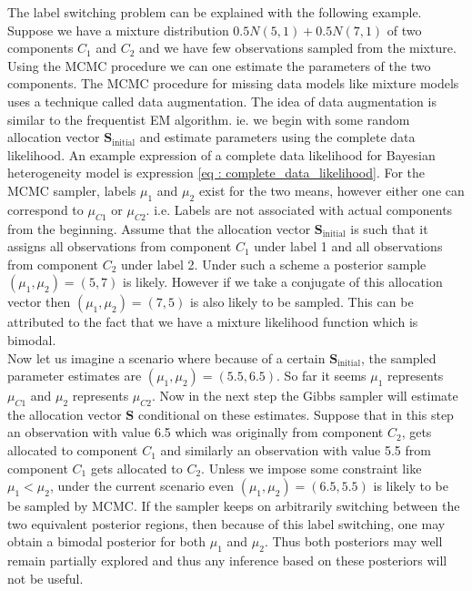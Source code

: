 The label switching problem can be explained with the following example. Suppose we have a mixture distribution $0.5N(5,1) + 0.5N(7,1)$ of two components $C_1$ and $C_2$ and we have few observations sampled from the mixture. Using the MCMC procedure we can one estimate the parameters of the two components. The MCMC procedure for missing data models like mixture models uses a technique called data augmentation. The idea of data augmentation is similar to the frequentist EM algorithm. ie. we begin with some random allocation vector $\boldsymbol{S}_\text{initial}$ and estimate parameters using the complete data likelihood. An example expression of a complete data likelihood for Bayesian heterogeneity model is expression \ref{eq : complete_data_likelihood}. For the MCMC sampler, labels $\mu_1$ and $\mu_2$ exist for the two means, however either one can correspond to $\mu_{C1}$ or $\mu_{C2}$. i.e. Labels are not associated with actual components from the beginning. Assume that the allocation vector $\boldsymbol{S}_\text{initial}$ is such that it assigns all observations from component $C_1$ under label 1 and all observations from component $C_2$ under label 2. Under such a scheme a posterior sample $(\mu_1,\mu_2) = (5,7)$ is likely. However if we take a conjugate of this allocation vector then $(\mu_1,\mu_2) = (7,5)$ is also likely to be sampled. This can be attributed to the fact that we have a mixture likelihood function which is bimodal.\\

Now let us imagine a scenario where because of a certain $\boldsymbol{S}_\text{initial}$, the sampled parameter estimates are $(\mu_1, \mu_2) = (5.5,6.5)$. So far it seems $\mu_1$ represents $\mu_{C1}$ and $\mu_2$ represents $\mu_{C2}$. Now in the next step the Gibbs sampler will estimate the allocation vector $\boldsymbol{S}$ conditional on these estimates. Suppose that in this step an observation with value 6.5 which was originally from component $C_2$, gets allocated to component $C_1$ and similarly an observation with value 5.5 from component $C_1$ gets allocated to $C_2$. Unless we impose some constraint like $\mu_1 < \mu_2$, under the current scenario even $(\mu_1,\mu_2) = (6.5, 5.5)$ is likely to be be sampled by MCMC. If the sampler keeps on arbitrarily switching between the two equivalent posterior regions, then because of this label switching, one may obtain a bimodal posterior for both $\mu_1$ and $\mu_2$. Thus both posteriors may well remain partially explored and thus any inference based on these posteriors will not be useful.

